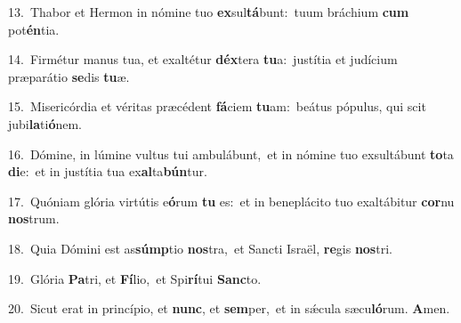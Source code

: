 {\numbfont\textcolor{\numbcolor}{13.}}~Thabor et Hermon in nómine tuo \textbf{ex}\-sul\-\textbf{tá}\-bunt:~\star tuum bráchium \textbf{cum} pot\-\textbf{én}\-tia.\par
{\numbfont\textcolor{\numbcolor}{14.}}~Firmétur manus tua, et exaltétur \textbf{déx}\-tera \textbf{tu}\-a:~\star justítia et judícium præparátio \textbf{se}\-dis \textbf{tu}\-æ.\par
{\numbfont\textcolor{\numbcolor}{15.}}~Misericórdia et véritas præcédent \textbf{fá}\-ciem \textbf{tu}\-am:~\star beátus pópulus, qui scit jubi\-\textbf{la}\-ti\-\textbf{ó}\-nem.\par
{\numbfont\textcolor{\numbcolor}{16.}}~Dómine, in lúmine vultus tui ambulábunt,~\dagger et in nómine tuo exsultábunt \textbf{to}\-ta \textbf{di}\-e:~\star et in justítia tua ex\-\textbf{al}\-ta\-\textbf{bún}\-tur.\par
{\numbfont\textcolor{\numbcolor}{17.}}~Quóniam glória virtútis e\-\textbf{ó}\-rum \textbf{tu} es:~\star et in beneplácito tuo exaltábitur \textbf{cor}\-nu \textbf{nos}\-trum.\par
{\numbfont\textcolor{\numbcolor}{18.}}~Quia Dómini est as\-\textbf{súmp}\-tio \textbf{nos}\-tra,~\star et Sancti Israël, \textbf{re}\-gis \textbf{nos}\-tri.\par
{\numbfont\textcolor{\numbcolor}{19.}}~Glória \textbf{Pa}\-tri, et \textbf{Fí}\-lio,~\star et Spi\-\textbf{rí}\-tui \textbf{Sanc}\-to.\par
{\numbfont\textcolor{\numbcolor}{20.}}~Sicut erat in princípio, et \textbf{nunc}\-, et \textbf{sem}\-per,~\star et in sǽcula sæcu\-\textbf{ló}\-rum. \textbf{A}\-men.\par

